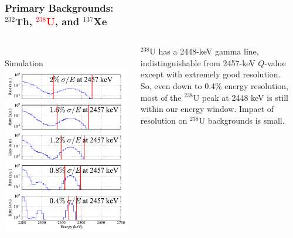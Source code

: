 \documentclass{beamer}
\begin{document}
\begin{frame}
\begin{center}
\frametitle{\hfill Primary Backgrounds:\\\hfill $^{232}$Th, \textcolor{red}{$^{238}$U}, and $^{137}$Xe}
\end{center}
\begin{columns}
\begin{column}{.59\textwidth}
\vspace{-0.5cm}\\%
Simulation\\
\includegraphics[keepaspectratio=true,width=\textwidth]{U_Spectra_vs_Res.pdf}
\end{column}
\begin{column}{.41\textwidth}
\vspace{0.5cm}

$^{238}$U has a 2448-keV gamma line, indistinguishable from 2457-keV $Q$-value except with extremely good resolution.\\[\baselineskip]

So, even down to 0.4\% energy resolution, most of the $^{238}$U peak at 2448 keV is still within our energy window.  Impact of resolution on $^{238}$U backgrounds is small.

\end{column}
\end{columns}
\end{frame}
\end{document}
